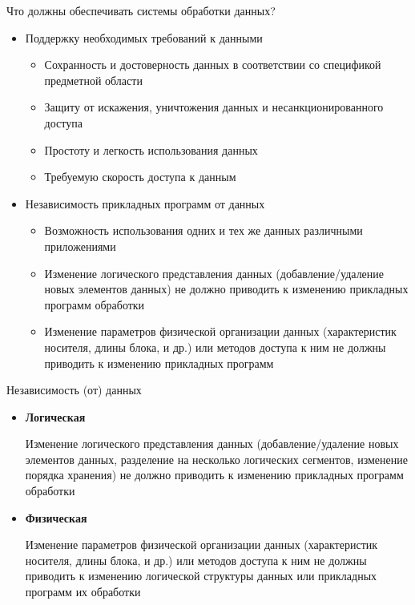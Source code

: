 \documentclass[12pt]{article}
\begin{document}
\begin{nota}{Что должны обеспечивать системы обработки данных?}
    \begin{itemize}
        \item Поддержку необходимых требований к данными
        \begin{itemize}
            \item Сохранность и достоверность данных в соответствии со спецификой предметной области
            \item Защиту от искажения, уничтожения данных и несанкционированного доступа
            \item Простоту и легкость использования данных
            \item Требуемую скорость доступа к данным
        \end{itemize}
        \item Независимость прикладных программ от данных 
        \begin{itemize}
            \item Возможность использования одних и тех же данных различными приложениями
            \item Изменение логического представления данных (добавление/удаление новых элементов данных) не должно приводить к изменению прикладных программ обработки
            \item Изменение параметров физической организации данных (характеристик носителя, длины блока, и др.) или методов доступа к ним не должны приводить к изменению прикладных программ
        \end{itemize}
    \end{itemize}
\end{nota}

\begin{defin}{Независимость (от) данных}
    \begin{itemize}
        \item \textbf{Логическая}
        
        Изменение логического представления данных (добавление/удаление новых элементов данных, разделение на несколько логических сегментов, изменение порядка хранения) не должно приводить к изменению прикладных программ обработки
        \item \textbf{Физическая}
        
        Изменение параметров физической организации данных (характеристик носителя, длины блока, и др.) или методов доступа к ним не должны приводить к изменению логической структуры данных или прикладных программ их обработки            
    \end{itemize}
\end{defin}
\end{document}
